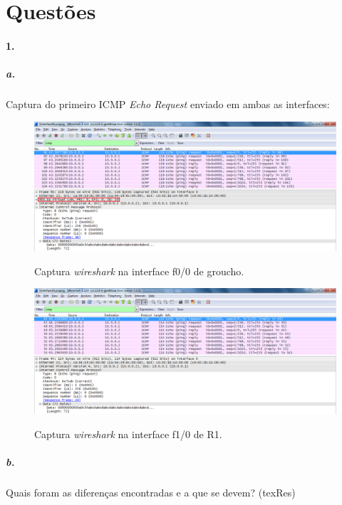 \section*{Questões}
\paragraph{1.}

\subparagraph{a.}
Captura do primeiro ICMP \emph{Echo Request} enviado em ambas as interfaces:

\begin{figure}[h]
\centering
\includegraphics[width=1\textwidth, height=0.32\textheight]{1_interface00-groucho.png}
\label{fig:2-capturaWireshark}
\caption{Captura \emph{wireshark} na interface \textsf{f0/0} de \textsf{groucho}.}
\end{figure}

\begin{figure}[h]
\centering
\includegraphics[width=1\textwidth, height=0.32\textheight]{1_interface10-R1.png}
\label{fig:3-capturaWireshark}
\caption{Captura \emph{wireshark} na interface \textsf{f1/0} de \textsf{R1}.}
\end{figure}


\subparagraph{b.}
Quais foram as diferenças encontradas e a que se devem? (texRes)



